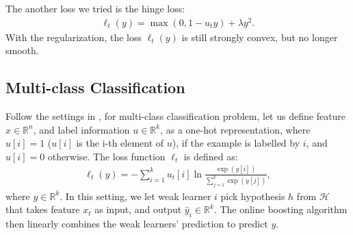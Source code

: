 The another loss we tried is the hinge loss:
\begin{align}
\ell_t(y) = \max(0, 1 - u_t y) + \lambda y^2.
\end{align}With the regularization, the loss $\ell_t(y)$ is still strongly convex, but no longer smooth. 



\subsection{Multi-class Classification}
Follow the settings in \citep{friedman2001greedy}, for multi-class classification problem, let us define feature $x\in\mathbb{R}^n$, and label information $u\in\mathbb{R}^k$, as a one-hot representation, where $u[i] = 1$ ($u[i]$ is the i-th element of $u$), if the example is labelled by $i$, and $u[i] = 0$ otherwise. The loss function $\ell_t$ is defined as:
\begin{align}
\ell_t(y) = -\sum_{i=1}^k u_t[i]\ln \frac{\exp(y[i])}{\sum_{j=1}^k\exp(y[j])},
\end{align} where $y\in\mathbb{R}^k$. In this setting, we let  weak learner $i$ pick hypothesis $h$ from $\mathcal{H}$ that takes feature $x_t$ as input, and output $\hat{y}_i\in\mathbb{R}^k$. The online boosting algorithm then linearly combines the weak learners' prediction to predict $y$. 



